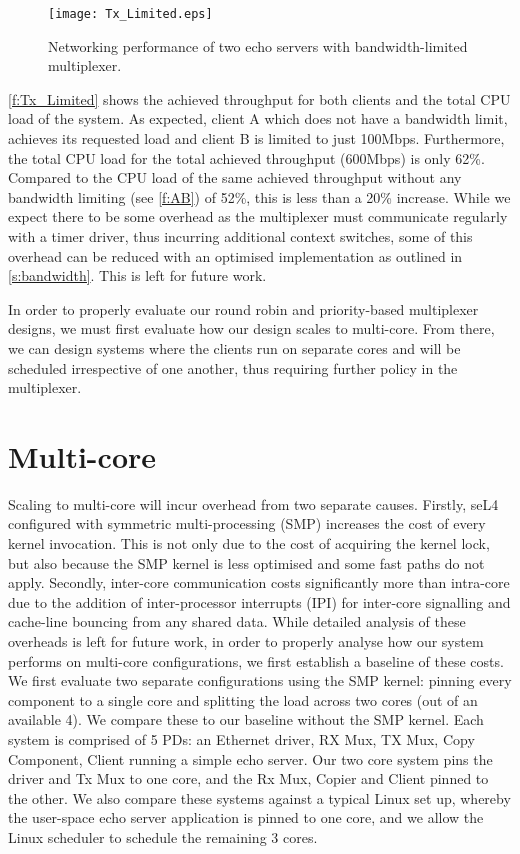 \begin{figure}[H]
    \centering
    \texttt{[image: Tx\_Limited.eps]}
    \caption{Networking performance of two echo servers with bandwidth-limited multiplexer.}
    \label{f:Tx_Limited}
\end{figure}

\autoref{f:Tx_Limited} shows the achieved throughput for both clients and the total CPU load of the system. As expected, 
client A which does not have a bandwidth limit, achieves its requested load and client B is limited to just 100Mbps. Furthermore, 
the total CPU load for the total achieved throughput (600Mbps) is only 62\%. Compared to the CPU load of the same 
achieved throughput without any bandwidth limiting (see \autoref{f:AB}) of 52\%, this is less than a 20\% increase. While we
expect there to be some overhead as the multiplexer must communicate regularly with a timer driver, thus incurring additional
context switches, some of this overhead can be reduced with an optimised implementation 
as outlined in \autoref{s:bandwidth}. This is left for future work.

In order to properly evaluate our round robin and priority-based multiplexer designs, we must first evaluate how our
design scales to multi-core. From there, we can design systems where the clients run on separate cores and will be scheduled irrespective
of one another, thus requiring further policy in the multiplexer.

\section{Multi-core}

Scaling to multi-core will incur overhead from two separate causes. Firstly, seL4 configured with symmetric multi-processing (SMP) increases
the cost of every kernel invocation. This is not only due to the cost of acquiring the kernel lock, but also because the SMP kernel is
less optimised and some fast paths do not apply. Secondly, inter-core communication costs significantly more than intra-core due to the addition of 
inter-processor interrupts (IPI) for inter-core signalling and cache-line bouncing from any shared data. While detailed analysis of
these overheads is left for future work, in order to properly
analyse how our system performs on multi-core configurations, we first establish a baseline of these costs. We first evaluate two separate configurations
using the SMP kernel: pinning every component to a single core and splitting the load across two cores (out of an available 4). 
We compare these to our baseline without the SMP kernel. Each system is comprised of 5 PDs: an Ethernet driver, RX Mux, 
TX Mux, Copy Component, Client running a simple echo server. Our two core system pins the driver and Tx Mux to one core, and 
the Rx Mux, Copier and Client pinned to the other. We also compare these systems against a typical Linux set up, whereby
the user-space echo server application is pinned to one core, and we allow the Linux scheduler to schedule the remaining 3 cores.\\ 

